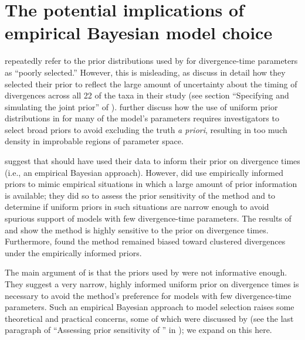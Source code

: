 \section*{The potential implications of empirical Bayesian model choice}
\citet{Hickerson2013} repeatedly refer to the prior distributions used by
\citet{Oaks2012} for divergence-time parameters as ``poorly selected.''
However, this is misleading, as \citet{Oaks2012} discuss in detail how they
selected their prior to reflect the large amount of uncertainty about the
timing of divergences across all 22 of the taxa in their study (see section
``Specifying and simulating the joint prior'' of \citet{Oaks2012}).
\citet{Oaks2012} further discuss how the use of uniform prior distributions in
\msb for many of the model's parameters requires investigators to select broad
priors to avoid excluding the truth \textit{a priori}, resulting in too much
density in improbable regions of parameter space.

\citet{Hickerson2013} suggest that \citet{Oaks2012} should have used their
data to inform their prior on divergence times (i.e., an empirical Bayesian
approach).
However, \citet{Oaks2012} did use empirically informed priors to mimic
empirical situations in which a large amount of prior information is available;
they did so to assess the prior sensitivity of the method and to determine if
uniform priors in such situations are narrow enough to avoid spurious support
of models with few divergence-time parameters.
The results of \citet{Oaks2012} and \citet{Hickerson2013} show the method is
highly sensitive to the prior on divergence times.
Furthermore, \citet{Oaks2012} found the method remained biased toward clustered
divergences under the empirically informed priors.

The main argument of \citet{Hickerson2013} is that the priors used by
\citet{Oaks2012} were not informative enough.
They suggest a very narrow, highly informed uniform prior on divergence times
is necessary to avoid the method's preference for models with few
divergence-time parameters.
Such an empirical Bayesian approach to model selection raises some theoretical
and practical concerns, some of which were discussed by \citet{Oaks2012} (see
the last paragraph of ``Assessing prior sensitivity of \msb'' in
\citet{Oaks2012}); we expand on this here.

